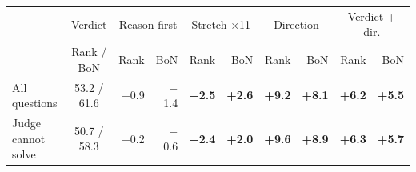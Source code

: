 \begin{tabular}{l c rr rr rr rr}
\toprule
& Verdict & \multicolumn{2}{c}{Reason first} & \multicolumn{2}{c}{Stretch $\times$11} & \multicolumn{2}{c}{Direction} & \multicolumn{2}{c}{Verdict + dir.} \\
\cmidrule(lr){3-4}\cmidrule(lr){5-6}\cmidrule(lr){7-8}\cmidrule(l){9-10}
& Rank / BoN & Rank & BoN & Rank & BoN & Rank & BoN & Rank & BoN \\
\midrule
All questions & 53.2 / 61.6 & $-$0.9 & $-$1.4 & \textbf{+2.5} & \textbf{+2.6} & \textbf{+9.2} & \textbf{+8.1} & \textbf{+6.2} & \textbf{+5.5} \\
Judge cannot solve & 50.7 / 58.3 & +0.2 & $-$0.6 & \textbf{+2.4} & \textbf{+2.0} & \textbf{+9.6} & \textbf{+8.9} & \textbf{+6.3} & \textbf{+5.7} \\
\bottomrule
\end{tabular}
